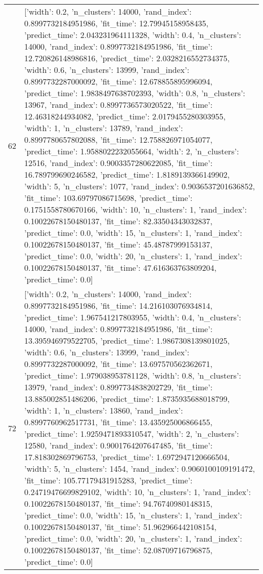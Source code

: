 \begin{tabular}{rl}
62 & [{'width': 0.2, 'n_clusters': 14000, 'rand_index': 0.8997732184951986, 'fit_time': 12.79945158958435, 'predict_time': 2.043231964111328}, {'width': 0.4, 'n_clusters': 14000, 'rand_index': 0.8997732184951986, 'fit_time': 12.720826148986816, 'predict_time': 2.0328216552734375}, {'width': 0.6, 'n_clusters': 13999, 'rand_index': 0.8997732287000092, 'fit_time': 12.678855895996094, 'predict_time': 1.9838497638702393}, {'width': 0.8, 'n_clusters': 13967, 'rand_index': 0.8997736573020522, 'fit_time': 12.46318244934082, 'predict_time': 2.0179455280303955}, {'width': 1, 'n_clusters': 13789, 'rand_index': 0.8997780657802088, 'fit_time': 12.758826971054077, 'predict_time': 1.9588022232055664}, {'width': 2, 'n_clusters': 12516, 'rand_index': 0.9003357280622085, 'fit_time': 16.789799690246582, 'predict_time': 1.8189139366149902}, {'width': 5, 'n_clusters': 1077, 'rand_index': 0.9036537201636852, 'fit_time': 103.69797086715698, 'predict_time': 0.1751558780670166}, {'width': 10, 'n_clusters': 1, 'rand_index': 0.10022678150480137, 'fit_time': 82.33504343032837, 'predict_time': 0.0}, {'width': 15, 'n_clusters': 1, 'rand_index': 0.10022678150480137, 'fit_time': 45.48787999153137, 'predict_time': 0.0}, {'width': 20, 'n_clusters': 1, 'rand_index': 0.10022678150480137, 'fit_time': 47.616363763809204, 'predict_time': 0.0}] \\
72 & [{'width': 0.2, 'n_clusters': 14000, 'rand_index': 0.8997732184951986, 'fit_time': 14.216103076934814, 'predict_time': 1.967541217803955}, {'width': 0.4, 'n_clusters': 14000, 'rand_index': 0.8997732184951986, 'fit_time': 13.395946979522705, 'predict_time': 1.9867308139801025}, {'width': 0.6, 'n_clusters': 13999, 'rand_index': 0.8997732287000092, 'fit_time': 13.697570562362671, 'predict_time': 1.979038953781128}, {'width': 0.8, 'n_clusters': 13979, 'rand_index': 0.8997734838202729, 'fit_time': 13.885002851486206, 'predict_time': 1.8735935688018799}, {'width': 1, 'n_clusters': 13860, 'rand_index': 0.8997760962517731, 'fit_time': 13.435925006866455, 'predict_time': 1.9259471893310547}, {'width': 2, 'n_clusters': 12580, 'rand_index': 0.9001764207647485, 'fit_time': 17.818302869796753, 'predict_time': 1.6972947120666504}, {'width': 5, 'n_clusters': 1454, 'rand_index': 0.9060100109191472, 'fit_time': 105.77179431915283, 'predict_time': 0.24719476699829102}, {'width': 10, 'n_clusters': 1, 'rand_index': 0.10022678150480137, 'fit_time': 94.76740980148315, 'predict_time': 0.0}, {'width': 15, 'n_clusters': 1, 'rand_index': 0.10022678150480137, 'fit_time': 51.962966442108154, 'predict_time': 0.0}, {'width': 20, 'n_clusters': 1, 'rand_index': 0.10022678150480137, 'fit_time': 52.08709716796875, 'predict_time': 0.0}] \\

\end{tabular}
